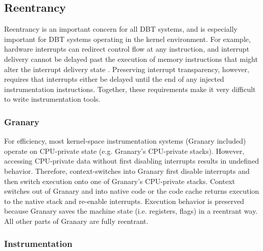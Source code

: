 \documentclass[preprint]{sigplanconf}
\begin{document}
\subsection{Reentrancy}
Reentrancy is an important concern for all DBT systems, and is especially important for DBT systems operating in the kernel environment. For example, hardware interrupts can redirect control flow at any instruction, and interrupt delivery cannot be delayed past the execution of memory instructions that might alter the interrupt delivery state \cite{DRK}. Preserving interrupt transparency, however, requires that interrupts either be delayed until the end of any injected instrumentation instructions. Together, these requirements make it very difficult to write instrumentation tools.

\subsubsection{Granary}
For efficiency, most kernel-space instrumentation systems (Granary included) operate on CPU-private state (e.g. Granary's CPU-private stacks). However, accessing CPU-private data without first disabling interrupts results in undefined behavior. Therefore, context-switches into Granary first disable interrupts and then switch execution onto one of Granary's CPU-private stacks. Context switches out of Granary and into native code or the code cache returns execution to the native stack and re-enable interrupts. Execution behavior is preserved because Granary saves the machine state (i.e. registers, flags) in a reentrant way. All other parts of Granary are fully reentrant.

\subsubsection{Instrumentation}\label{sec:interrupt_delay}
\end{document}

